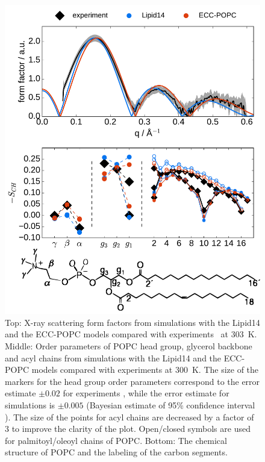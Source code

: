 \begin{figure}[tb!] 
  \centering 
  \includegraphics[width=\figwidth]{../img/ecc_popc/Order-parameters_form-factors_exp-L14-ECCL17_q80_sig89_POPC-struct.pdf} 
  \caption{ \label{fig:simVSexpNOions} 
    Top: X-ray scattering form factors from simulations with the Lipid14 \citep{dickson14} and 
    the ECC-POPC \citep{melcr18} models compared with experiments~\citep{kucerka11} at 303~K. 
    Middle: Order parameters of POPC head group, glycerol backbone and acyl chains  
    from simulations with the Lipid14 and the ECC-POPC models 
    compared with experiments \citep{ferreira13} at 300~K. 
    The size of the markers for the head group order parameters correspond to 
    the error estimate $\pm 0.02$ for experiments \citep{botan15,ollila16}, 
    while the error estimate for simulations is $\pm 0.005$
    (Bayesian estimate of 95\% confidence interval \citep{scipy}).
    The size of the points for acyl chains are decreased by a factor of 3 to improve the clarity of the plot.
    Open/closed symbols are used for palmitoyl/oleoyl chains of POPC. 
    Bottom: The chemical structure of POPC and the labeling of the carbon segments. 
  }  
\end{figure} 


